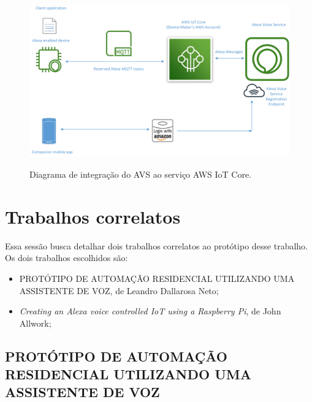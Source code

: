 \begin{figure}[htbp]
	\centering
	\caption{Diagrama de integração do AVS ao serviço AWS IoT Core.}
	\includegraphics[scale=0.6]{Imagens/integracao_avs_aws_iot.png}
	\label{fig:integracao_avs_aws_iot}
\end{figure}

\section{Trabalhos correlatos}

Essa sessão busca detalhar dois trabalhos correlatos ao protótipo desse trabalho. Os dois trabalhos escolhidos são:

\begin{itemize}
	\item PROTÓTIPO DE AUTOMAÇÃO RESIDENCIAL UTILIZANDO UMA ASSISTENTE DE VOZ, de Leandro Dallarosa Neto;
	\item \textit{Creating an Alexa voice controlled IoT using a Raspberry Pi}, de John Allwork;
\end{itemize}

\subsection{PROTÓTIPO DE AUTOMAÇÃO RESIDENCIAL UTILIZANDO UMA ASSISTENTE DE VOZ}\label{subsection:prototipo_de_automacao_residencial_utilizando_uma_assistente_de_voz}

